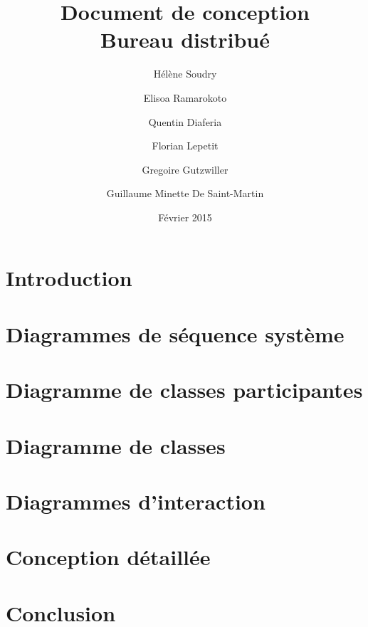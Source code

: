 \documentclass[a4paper, 12pt]{report}
\title{Document de conception \\ Bureau distribué}
\author{Hélène Soudry \and Elisoa Ramarokoto \and Quentin Diaferia \and Florian Lepetit \and Gregoire Gutzwiller \and Guillaume Minette De Saint-Martin}
\date{Février 2015}
\begin{document}
\maketitle
\tableofcontents
\chapter*{Introduction}

\chapter{Diagrammes de séquence système}

\chapter{Diagramme de classes participantes}

\chapter{Diagramme de classes}

\chapter{Diagrammes d'interaction}
 
\chapter{Conception détaillée}
 
\chapter*{Conclusion}

\end{document}
